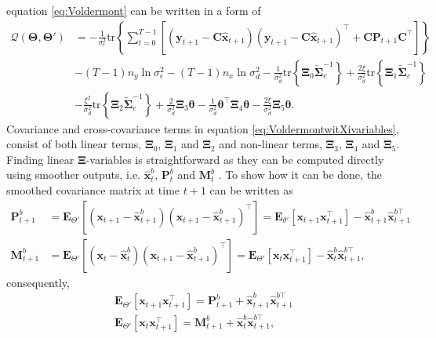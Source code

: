 \documentclass[]{article}
\begin{document}
equation \eqref{eq:Voldermont} can be written in a form of
\begin{align}\label{eq:VoldermontwitXivariables}
 \mathcal Q(\boldsymbol \Theta,\boldsymbol\Theta')&=-\frac{1}{\sigma_{\epsilon}^2}\mathrm{tr}\left\lbrace\boldsymbol\sum_{t=0}^{T-1}\left[ (\mathbf y_{t+1}-\mathbf C\mathbf{\hat{x}}_{t+1}) (\mathbf y_{t+1}-\mathbf C\mathbf{\hat{x}}_{t+1})^\top+\mathbf C \mathbf P_{t+1}\mathbf C^\top\right] \right\rbrace\nonumber \\
&-(T-1)n_y\ln \sigma_{\epsilon}^2-(T-1)n_x\ln\sigma_d^2-\frac{1}{\sigma_d^2}\mathrm{tr}\left\lbrace \boldsymbol\Xi_{0} \tilde{\boldsymbol\Sigma}_e^{-1}\right\rbrace +\frac{2\xi}{\sigma_d^2} \mathrm{tr}\left\lbrace \boldsymbol\Xi_{1} \tilde{\boldsymbol\Sigma}_e^{-1}\right\rbrace 
 \nonumber \\
&-\frac{\xi^2}{\sigma_d^2}\mathrm{tr} \left\lbrace\boldsymbol\Xi_{2}\tilde{\boldsymbol\Sigma}_e^{-1} \right\rbrace +\frac{2}{\sigma_d^2}\boldsymbol\Xi_{3}\boldsymbol\theta-\frac{1}{\sigma_d^2}\boldsymbol\theta^\top \boldsymbol\Xi_{4}\boldsymbol\theta-\frac{2\xi}{\sigma_d^2}\boldsymbol \Xi_{5} \boldsymbol\theta.
\end{align}
Covariance and cross-covariance terms in equation \eqref{eq:VoldermontwitXivariables}, consist of both linear terms, $\boldsymbol\Xi_0$, $\boldsymbol\Xi_1$ and $\boldsymbol\Xi_2$ and non-linear terms, $\boldsymbol\Xi_3$, $\boldsymbol\Xi_4$ and  $\boldsymbol\Xi_5$. Finding linear $\boldsymbol\Xi$-variables is straightforward as they can be computed directly using smoother outputs, i.e. $\hat{\mathbf x}_t^b $, $\mathbf P_t^b$ and $\mathbf M_t^b$ \cite{Gibsona2005}. To show how it can be done, the smoothed covariance matrix at time $t+1$ can be written as
\begin{align}
 \mathbf P_{t+1}^b&=\mathbf E_{\Theta'}\left[(\mathbf x_{t+1}-\mathbf{\hat x}_{t+1}^b)(\mathbf x_{t+1}-\mathbf{\hat x}_{t+1}^b)^{\top}\right]=\mathbf E_{\theta'}\left[\mathbf x_{t+1}\mathbf x_{t+1}^\top\right]-\mathbf {\hat x}_{t+1}^b\mathbf{\hat x}_{t+1}^{b\top}\label{eq:EM-PrimeryXi0derivation1}\\
 \mathbf M_{t+1}^b&=\mathbf E_{\Theta'}\left[(\mathbf x_t-\mathbf{\hat x}_t^b)(\mathbf x_{t+1}-\mathbf{\hat x}_{t+1}^b)^{\top}\right]= \mathbf E_{\Theta'}\left[\mathbf x_t\mathbf x_{t+1}^\top\right]-\mathbf {\hat x}_t^b\mathbf{\hat x}_{t+1}^{b\top},\label{eq:EM-PrimeryXi1derivation1}
\end{align}
consequently,
\begin{align}\label{eq:EM-Xi0derivation1}
 \mathbf E_{\Theta'}\left[\mathbf x_{t+1}\mathbf x_{t+1}^\top\right]=\mathbf P_{t+1}^b+\mathbf {\hat x}_{t+1}^b\mathbf{\hat x}_{t+1}^{b\top}\\
 \mathbf E_{\Theta'}\left[\mathbf x_t\mathbf x_{t+1}^\top\right]=\mathbf M_{t+1}^b+\mathbf {\hat x}_t^b\mathbf{\hat x}_{t+1}^{b\top}\label{eq:EM-Xi1derivation1},
\end{align}
\end{document}

